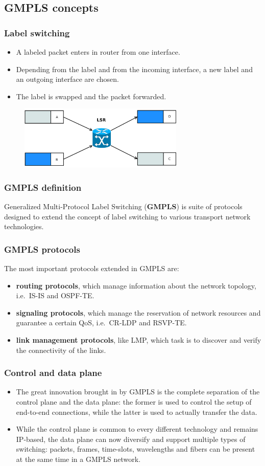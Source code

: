 \documentclass{beamer}
\begin{document}
\subsection{GMPLS concepts}
\frame
{
  \frametitle{Label switching}

  \begin{itemize}
  \item<1-> A labeled packet enters in router from one interface.
  \item<2-> Depending from the label and from the incoming interface, a new
    label and an outgoing interface are chosen.
  \item<3-> The label is swapped and the packet forwarded.
  \end{itemize}
  
  \begin{figure}[!hbp]
    \centering
    \includegraphics[width=0.7\textwidth]{img/label_switching}
  \end{figure}
}
\frame
{
  \frametitle{GMPLS definition}

  Generalized Multi-Protocol Label Switching (\textbf{GMPLS}) is suite
  of protocols designed to extend the concept of label switching to
  various transport network technologies.

}
\frame
{
  \frametitle{GMPLS protocols}
  
  The most important protocols extended in GMPLS are:
  \begin{itemize}
  \item \textbf{routing protocols}, which manage information about the
    network topology, i.e.\ IS-IS and OSPF-TE.
  \item \textbf{signaling protocols}, which manage the reservation of
    network resources and guarantee a certain QoS, i.e.\ CR-LDP and
    RSVP-TE.
  \item \textbf{link management protocols}, like LMP, which task is to
    discover and verify the connectivity of the links. 
  \end{itemize}
}
\frame
{
  \frametitle{Control and data plane}

  \begin{itemize}
  \item<1->The great innovation brought in by GMPLS is the complete
    separation of the control plane and the data plane: the former is
    used to control the setup of end-to-end connections, while the
    latter is used to actually transfer the data.
  \item<2-> While the control plane is common to every different
    technology and remains IP-based, the data plane can now diversify
    and support multiple types of switching: packets, frames,
    time-slots, wavelengths and fibers can be present at the same time
    in a GMPLS network.
\end{itemize}
}
\end{document}
